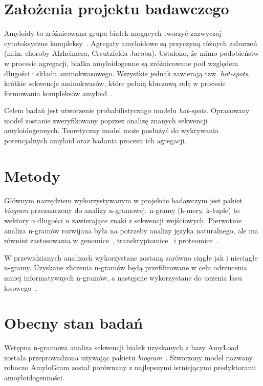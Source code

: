 \documentclass{article}
\author{Michał Burdukiewicz, Przemysław Gagat}
\title{Predykcja białek amyloidogennych \linebreak \vskip{} \large{Projekt badawczy Doktoranckiego Koła Naukowego Bioinformatyki}}
\date{}
\begin{document}
\maketitle

\section{Założenia projektu badawczego}

Amyloidy to zróżnicowana grupa białek mogących tworzyć zazwyczaj cytotoksyczne kompleksy~\citep{fandrich_oligomeric_2012}. Agregaty amyloidowe są przyczyną różnych zaburzeń (m.in. choroby Alzheimera, Creutzfelda-Jacoba). Ustalono, że mimo podobieństw w procesie agregacji, białka amyloidogenne są zróżnicowane pod względem długości i składu aminokwasowego. Wszystkie jednak zawierają tzw. \textit{hot-spots}, krótkie sekwencje aminokwasów, które pełnią kluczową rolę w procesie formowania kompleksów amyloid~\citep{breydo_structural_2015}.

Celem badań jest utworzenie probabilistyczngo modelu \textit{hot-spots}. Opracowany model zostanie zweryfikowany poprzez analizę znanych sekwencji amyloidogennych. Teoretyczny model może posłużyć do wykrywania potencjalnych amyloid oraz badania procesu ich agregacji. 

\section{Metody}

Głównym narzędziem wykorzystywanym w projekcie badawczym jest pakiet \textit{biogram} przeznaczony do analizy n-gramowej. n-gramy (k-mery, k-tuple) to wektory o długości $n$ zawierające znaki z sekwencji wejściowych. Pierwotnie analiza n-gramów rozwijana była na potrzeby analizy języka naturalnego, ale ma również zastosowania w genomice~\citep{fang2011}, transkryptomice~\citep{wang2014} i proteomice~\citep{guo2014}. 

W przewidzianych analizach wykorzystane zostaną zarówno ciągłe jak i nieciągłe n-gramy. Uzyskane zliczenia n-gramów będą przefiltrowane w celu odrzucenia mniej informatywnych n-gramów, a następnie wykorzystane do uczenia lasu losowego~\citep{liaw_classification_2002}.

\section{Obecny stan badań}

Wstępna n-gramowa analiza sekwencji białek uzyskanych z bazy AmyLoad\citep{wozniak_amyload:_2015} została przeprowadzona używając pakietu \textit{biogram}~\citep{burdukiewicz}. Stworzony model nazwany roboczo AmyloGram został porównany z najlepszymi istniejącymi predyktorami amoyloidogenności.
\end{document}
